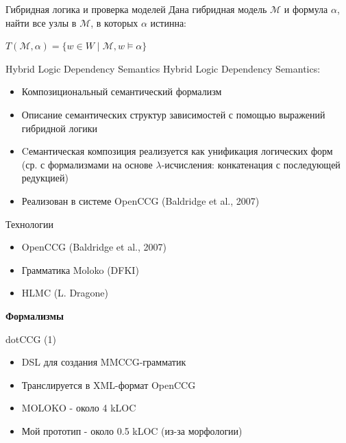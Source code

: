 \documentclass{beamer}
\begin{document}
\begin{frame}{Гибридная логика и проверка моделей}
Дана гибридная модель $\mathcal{M}$ и формула $\alpha$, найти все узлы в $\mathcal{M}$, в которых $\alpha$ истинна:
\bigskip
\begin{center}
    $T(\mathcal{M}, \alpha) = \{ w \in W \; | \; \mathcal{M}, w \models \alpha \}$
\end{center}
\end{frame}

\begin{frame}{Hybrid Logic Dependency Semantics}
Hybrid Logic Dependency Semantics:\\
\bigskip
\begin{itemize}
	\item Композициональный семантический формализм 
	\item Описание семантических структур зависимостей с помощью выражений гибридной логики
	\item Cемантическая композиция реализуется как унификация логических форм (ср. с формализмами на основе $\lambda$-исчисления: конкатенация с последующей редукцией)
	\item Реализован в системе OpenCCG (Baldridge et al., 2007)
\end{itemize}
\end{frame}

\begin{frame}{Технологии}
\begin{itemize}
	\item OpenCCG (Baldridge et al., 2007)
	\item Грамматика Moloko (DFKI)
	\item HLMC (L. Dragone)
\end{itemize}
\end{frame}

\begin{frame}{}
\begin{center}
	\textbf{Формализмы}\\
\end{center}
\end{frame}


\begin{frame}{dotCCG (1)}
\begin{itemize}
	\item DSL для создания MMCCG-грамматик
	\item Транслируется в XML-формат OpenCCG
	\item MOLOKO - около 4 kLOC 
	\item Мой прототип - около 0.5 kLOC (из-за морфологии)
\end{itemize}
\end{frame}
\end{document}
